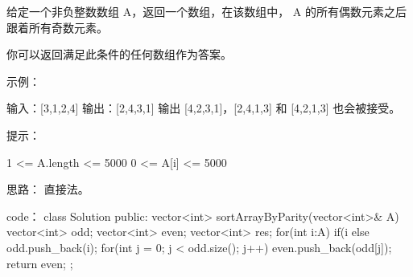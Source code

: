 给定一个非负整数数组 A，返回一个数组，在该数组中， A 的所有偶数元素之后跟着所有奇数元素。

你可以返回满足此条件的任何数组作为答案。

 

示例：

输入：[3,1,2,4]
输出：[2,4,3,1]
输出 [4,2,3,1]，[2,4,1,3] 和 [4,2,1,3] 也会被接受。

 

提示：

    1 <= A.length <= 5000
    0 <= A[i] <= 5000





























思路：
直接法。






























code：
class Solution {
public:
    vector<int> sortArrayByParity(vector<int>& A) {
        vector<int> odd;
        vector<int> even;
        vector<int> res;
        for(int i:A)
        {
            if(i%
            else odd.push_back(i);
        }
        for(int j = 0; j < odd.size(); j++)
            even.push_back(odd[j]);
        return even;
    }
};